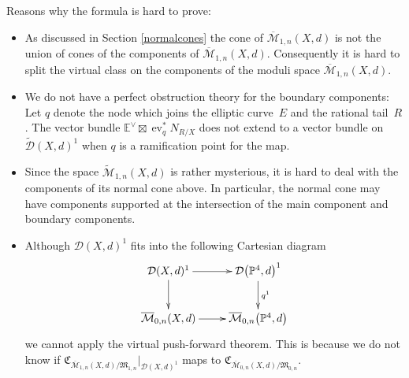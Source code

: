 \documentclass[pdftex]{sigma}
\numberwithin{equation}{section}
\newcommand{\MM}[4]{\overline{\mathcal M}_{#1,#2}(#3,#4)}
\begin{document}
Reasons why the formula is hard to prove:
\begin{itemize}\itemsep=0pt
 \item As discussed in Section \ref{normalcones} the cone of $\MM{1}{n}{X}{d}$ is not the union of cones of the components of $\MM{1}{n}{X}{d}$. Consequently it is hard to split the virtual class on the components of the moduli space $\MM{1}{n}{X}{d}$.
 \item We do not have a perfect obstruction theory for the boundary components: Let $q$ denote the node which joins the elliptic curve~$E$ and the rational tail~$R$. The vector bundle $\mathbb E^\vee\boxtimes\operatorname{ev}_q^* N_{R/X}$ does not extend to a vector bundle on $\widetilde{\mathcal D}(X,d)^1$ when $q$ is a ramification point for the map.

\item Since the space $\widetilde{\mathcal M}_{1,n}(X,d)$ is rather mysterious, it is hard to deal with the components of its normal cone above. In particular, the normal cone may have components supported at the intersection of the main component and boundary components.

\item Although $\mathcal D(X,d)^1$ fits into the following Cartesian diagram
\begin{equation*}
 \begin{xymatrix}
 {
 \mathcal D(X,d)^1 \ar[r]\ar[d]& \mathcal D\big(\mathbb P^4,d\big)^1\ar[d]^{q^1}\\
 \MM{0}{n}{X}{d} \ar[r] & \overline{\mathcal{M}}_{0,n}\big({\mathbb P}^4,d\big)
 }
 \end{xymatrix}
\end{equation*}
we cannot apply the virtual push-forward theorem. This is because we do not know if $\mathfrak C_{\MM{1}{n}{X}{d}/\mathfrak{M}_{1,n}}|_{\mathcal {D}(X,d)^1}$ maps to $\mathfrak C_{\MM{0}{n}{X}{d}/\mathfrak{M}_{0,n}}$.
\end{itemize}
\end{document}
